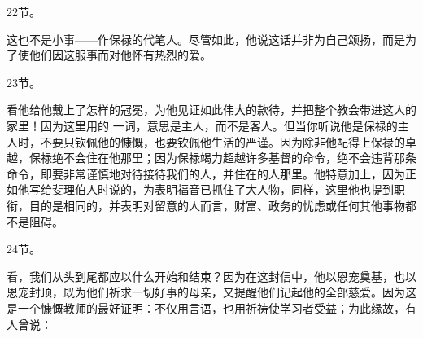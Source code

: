 22节。\par

这也不是小事——作保禄的代笔人。尽管如此，他说这话并非为自己颂扬，而是为了使他们因这服事而对他怀有热烈的爱。\par

23节。\par

看他给他戴上了怎样的冠冕，为他见证如此伟大的款待，并把整个教会带进这人的家里！因为这里用的  一词，意思是主人，而不是客人。但当你听说他是保禄的主人时，不要只钦佩他的慷慨，也要钦佩他生活的严谨。因为除非他配得上保禄的卓越，保禄绝不会住在他那里；因为保禄竭力超越许多基督的命令，绝不会违背那条命令，即要非常谨慎地对待接待我们的人，并住在的人那里。他特意加上，因为正如他写给斐理伯人时说的，为表明福音已抓住了大人物，同样，这里他也提到职衔，目的是相同的，并表明对留意的人而言，财富、政务的忧虑或任何其他事物都不是阻碍。\par

24节。\par

看，我们从头到尾都应以什么开始和结束？因为在这封信中，他以恩宠奠基，也以恩宠封顶，既为他们祈求一切好事的母亲，又提醒他们记起他的全部慈爱。因为这是一个慷慨教师的最好证明：不仅用言语，也用祈祷使学习者受益；为此缘故，有人曾说：\par

